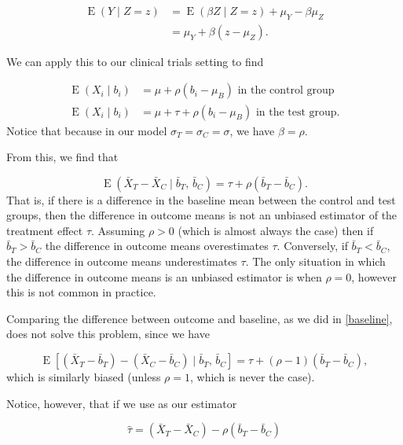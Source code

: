 \documentclass[
  openany]{book}
\theoremstyle{definition}
\theoremstyle{definition}
\theoremstyle{definition}
\theoremstyle{definition}
\theoremstyle{remark}
\begin{document}
\[
\begin{aligned}
\operatorname{E}\left(Y\mid{Z=z}\right) & = \operatorname{E}\left(\beta Z\mid{Z=z}\right) + \mu_Y - \beta\mu_Z\\
& = \mu_Y + \beta\left(z - \mu_Z\right).
\end{aligned}
\]

We can apply this to our clinical trials setting to find

\[
\begin{aligned}
\operatorname{E}\left(X_i\mid{b_i}\right) &= \mu + \rho\left(b_i - \mu_B\right)\text{ in the control group}\\
\operatorname{E}\left(X_i\mid{b_i}\right) &= \mu +\tau + \rho\left(b_i - \mu_B\right)\text{ in the test group.}
\end{aligned}
\]
Notice that because in our model \(\sigma_T = \sigma_C = \sigma\), we have \(\beta = \rho\).

From this, we find that

\begin{equation}
\operatorname{E}\left(\bar{X}_T - \bar{X}_C\mid{\bar{b}_T,\,\bar{b}_C}\right) = \tau + \rho\left(\bar{b}_T - \bar{b}_C\right). 
\label{eq:diffexp}
\end{equation}
That is, if there is a difference in the baseline mean between the control and test groups, then the difference in outcome means is not an unbiased estimator of the treatment effect \(\tau\). Assuming \(\rho>0\) (which is almost always the case) then if \(\bar{b}_T>\bar{b}_C\) the difference in outcome means overestimates \(\tau\). Conversely, if \(\bar{b}_T<\bar{b}_C\), the difference in outcome means underestimates \(\tau\). The only situation in which the difference in outcome means is an unbiased estimator is when \(\rho=0\), however this is not common in practice.

Comparing the difference between outcome and baseline, as we did in \ref{baseline}, does not solve this problem, since we have

\[\operatorname{E}\left[\left(\bar{X}_T - \bar{b}_T\right) - \left(\bar{X}_C - \bar{b}_C\right)\mid{\bar{b}_T,\,\bar{b}_C}\right] = \tau + \left(\rho-1\right)\left(\bar{b}_T - \bar{b}_C\right),\]
which is similarly biased (unless \(\rho=1\), which is never the case).

Notice, however, that if we use as our estimator

\begin{equation}
\hat{\tau} = \left(\bar{X}_T - \bar{X}_C\right) - \rho \left(\bar{b}_T - \bar{b}_C\right)
\label{eq:ancovaest}
\end{equation}
\end{document}
